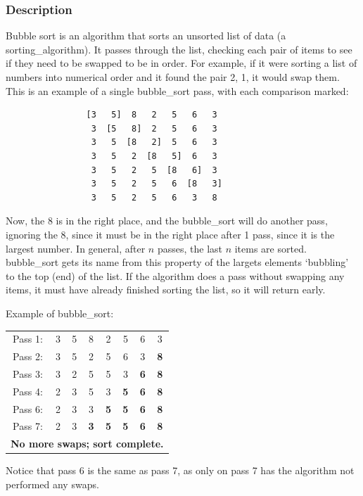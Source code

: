         \subsubsection{Description}
            Bubble sort is an \gls{algorithm} that sorts an unsorted list of data (a \gls{sorting_algorithm}).
            It passes through the list, checking each pair of items to see if they need to be swapped to be in order.
            For example, if it were sorting a list of numbers into numerical order and it found the pair 2, 1, it would swap them.
            This is an example of a single \gls{bubble_sort} pass, with each comparison marked:
            \begin{verbatim}
                [3   5]  8   2   5   6   3
                 3  [5   8]  2   5   6   3
                 3   5  [8   2]  5   6   3
                 3   5   2  [8   5]  6   3
                 3   5   2   5  [8   6]  3
                 3   5   2   5   6  [8   3]
                 3   5   2   5   6   3   8
            \end{verbatim}
            Now, the 8 is in the right place, and the \gls{bubble_sort} will do another pass, ignoring the 8, since it must be in the right place after 1 pass, since it is the largest number.
            In general, after $n$ passes, the last $n$ items are sorted.
            \Gls{bubble_sort} gets its name from this property of the largets elements `bubbling' to the top (end) of the list.
            If the \gls{algorithm} does a pass without swapping any items, it must have already finished sorting the list, so it will return early.

            Example of \gls{bubble_sort}:
            \begin{center}
            \begin{tabular}{c c c c c c c c}
                Pass 1: &3 &5 &8 &2 &5 &6 &3 \\
                Pass 2: &3 &5 &2 &5 &6 &3 &\textbf{8} \\
                Pass 3: &3 &2 &5 &5 &3 &\textbf{6} &\textbf{8} \\
                Pass 4: &2 &3 &5 &3 &\textbf{5} &\textbf{6} &\textbf{8} \\
                Pass 6: &2 &3 &3 &\textbf{5} &\textbf{5} &\textbf{6} &\textbf{8} \\
                Pass 7: &2 &3 &\textbf{3} &\textbf{5} &\textbf{5} &\textbf{6} &\textbf{8} \\
                \multicolumn{8}{c}{\textbf{No more swaps; sort complete.}}
            \end{tabular}
            \end{center}
            Notice that pass 6 is the same as pass 7, as only on pass 7 has the algorithm not performed any swaps.

